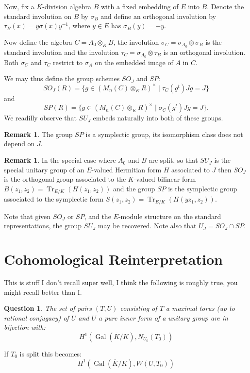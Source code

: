 \documentclass{article}
\theoremstyle{plain}
\newtheorem{question}[theorem]{Question}
\theoremstyle{definition}
\newtheorem{remark}[theorem]{Remark}
\numberwithin{equation}{section}
\DeclareMathOperator{\Gal}{Gal}
\DeclareMathOperator{\Tr}{Tr}
\begin{document}
Now, fix a $K$-division algebra $B$ with a fixed embedding of $E$ into $B$. Denote the standard involution on $B$ by $\sigma_{B}$ and define an orthogonal involution by $\tau_B(x) = y\sigma(x)y^{-1}$, where $y\in E$ has $\sigma_B(y) = -y$.

Now define the algebra $C = A_0 \otimes_K B$, the involution $\sigma_C = \sigma_{A_0} \otimes \sigma_B$ is the standard involution and the involution $\tau_C = \sigma_{A_0} \otimes \tau_B$ is an orthogonal involution.
Both $\sigma_C$ and $\tau_C$ restrict to $\sigma_A$ on the embedded image of $A$ in $C$.

We may thus define the group schemes $SO_J$ and $SP$:
\[ SO_J(R) =  \{ g\in (M_{n}(C) \otimes_K R)^\times \mid \tau_C(g^t)Jg = J  \} \]
and
\[ SP(R) =  \{ g\in (M_{n}(C) \otimes_K R)^\times \mid \sigma_C(g^t)Jg = J  \}. \]
We readilly observe that $SU_J$ embeds naturally into both of these groups.
\begin{remark}
The group $SP$ is a symplectic group, its isomorphism class does not depend on $J$.
\end{remark}

\begin{remark}
In the special case where $A_0$ and $B$ are split, so that $SU_J$ is the special unitary group of an $E$-valued Hermitian form $H$ associated to $J$ then
$SO_J$ is the orthogonal group associated to the $K$-valued bilinear form $B(z_1,z_2) = \Tr_{E/K}(H(z_1,z_2))$ and the group $SP$ is the symplectic group associated to the symplectic form $S(z_1,z_2) = \Tr_{E/K}(H(yz_1,z_2))$.

Note that given $SO_J$ or $SP$, and the $E$-module structure on the standard representations, the group $SU_J$ may be recovered.
Note also that $U_J = SO_J \cap SP$.
\end{remark}




\section{Cohomological Reinterpretation}

This is stuff I don't recall super well, I think the following is roughly true, you might recall better than I.

\begin{question}
The set of pairs $(T,U)$ consisting of $T$ a maximal torus (up to rational conjugacy) of $U$ and $U$ a pure inner form of a unitary group are in bijection with:
\[ H^1( \Gal(\overline{K}/K), N_{U_0}(T_0) ) \]
\end{question}
If $T_0$ is split this becomes:
\[ H^1( \Gal(\overline{K}/K), W(U,T_0) ) \]
\end{document}
